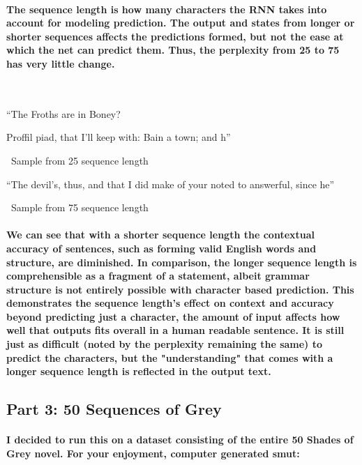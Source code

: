 \documentclass[10pt,a4paper]{report}
\begin{document}
\paragraph{
The sequence length is how many characters the RNN takes into account for modeling prediction. The output and states from longer or shorter sequences affects the predictions formed, but not the ease at which the net can predict them. Thus, the perplexity from 25 to 75 has very little change. 
}

\
\vspace{5mm}

``The Froths are in Boney?

Proffil
piad, that I'll keep with:
Bain a town; and h''

\ 
Sample from 25 sequence length
\vspace{5mm}

``The devil's, thus, and that I did make of your noted to answerful, since he''

\ 
Sample from 75 sequence length
\

\paragraph{
We can see that with a shorter sequence length the contextual accuracy of sentences, such as forming valid English words and structure, are diminished. In comparison, the longer sequence length is comprehensible as a fragment of a statement, albeit grammar structure is not entirely possible with character based prediction. This demonstrates the sequence length's effect on context and accuracy beyond predicting just a character, the amount of input affects how well that outputs fits overall in a human readable sentence. It is still just as difficult (noted by the perplexity remaining the same) to predict the characters, but the "understanding" that comes with a longer sequence length is reflected in the output text.
}

\subsection{Part 3: 50 Sequences of Grey}

\paragraph{I decided to run this on a dataset consisting of the entire 50 Shades of Grey novel. For your enjoyment, computer generated smut:}
\end{document}

